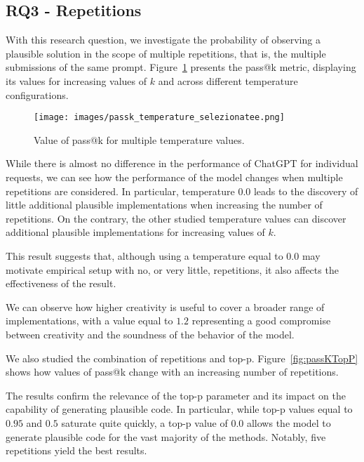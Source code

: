 \subsection{RQ3 - Repetitions}
With this research question, we investigate the probability of observing a plausible solution in the scope of multiple repetitions, that is, the multiple submissions of the same prompt. Figure~\ref{fig:passKTemperature} presents the pass@k metric, displaying its values for increasing values of $k$ and across different temperature configurations.

\begin{figure}[ht]
        \centering
        \texttt{[image: images/passk\_temperature\_selezionatee.png]}
        \caption{Value of pass@k for multiple temperature values.}
        \label{fig:passKTemperature}
\end{figure}

While there is almost no difference in the performance of ChatGPT for individual requests, we can see how the performance of the model changes when multiple repetitions are considered. In particular, temperature $0.0$ leads to the discovery of little additional plausible implementations when increasing the number of repetitions. On the contrary, the other studied temperature values can discover additional plausible implementations for increasing values of $k$. 

This result suggests that, although using a temperature equal to $0.0$ may motivate empirical setup with no, or very little, repetitions, it also affects the effectiveness of the result.  

We can observe how higher creativity is useful to cover a broader range of implementations, with a value equal to $1.2$ representing a good compromise between creativity and the soundness of the behavior of the model. 

We also studied the combination of repetitions and top-p. Figure~\ref{fig:passKTopP} shows how values of pass@k change with an increasing number of repetitions.

The results confirm the relevance of the top-p parameter and its impact on the capability of generating plausible code. In particular, while top-p values equal to $0.95$ and $0.5$ saturate quite quickly, a top-p value of $0.0$ allows the model to generate plausible code for the vast majority of the methods. Notably, five repetitions yield the best results. %


